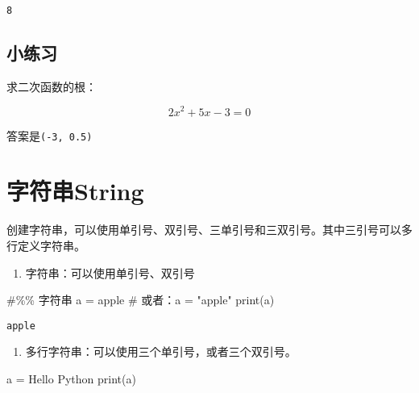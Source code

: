 \documentclass[
  letterpaper,
  DIV=11,
  numbers=noendperiod]{scrreprt}
\newenvironment{Shaded}{\begin{snugshade}}{\end{snugshade}}
\newcommand{\BuiltInTok}[1]{\textcolor[rgb]{0.00,0.23,0.31}{#1}}
\newcommand{\CommentTok}[1]{\textcolor[rgb]{0.37,0.37,0.37}{#1}}
\newcommand{\NormalTok}[1]{\textcolor[rgb]{0.00,0.23,0.31}{#1}}
\newcommand{\OperatorTok}[1]{\textcolor[rgb]{0.37,0.37,0.37}{#1}}
\newcommand{\StringTok}[1]{\textcolor[rgb]{0.13,0.47,0.30}{#1}}
\providecommand{\tightlist}{%
  \setlength{\itemsep}{0pt}\setlength{\parskip}{0pt}}\usepackage{longtable,booktabs,array}
\begin{document}
\begin{verbatim}
8
\end{verbatim}

\hypertarget{ux5c0fux7ec3ux4e60}{%
\subsection{小练习}\label{ux5c0fux7ec3ux4e60}}

求二次函数的根：

\[
2x^2 + 5x - 3 = 0
\]

答案是\texttt{(-3,\ 0.5)}

\hypertarget{ux5b57ux7b26ux4e32string}{%
\section{字符串String}\label{ux5b57ux7b26ux4e32string}}

创建字符串，可以使用单引号、双引号、三单引号和三双引号。其中三引号可以多行定义字符串。

\begin{enumerate}
\def\labelenumi{\arabic{enumi}.}
\tightlist
\item
  字符串：可以使用单引号、双引号
\end{enumerate}

\begin{Shaded}
\begin{Highlighting}[]
\CommentTok{\#\%\% 字符串}
\NormalTok{a }\OperatorTok{=} \StringTok{\textquotesingle{}apple\textquotesingle{}} \CommentTok{\# 或者：a = "apple"}
\BuiltInTok{print}\NormalTok{(a)}
\end{Highlighting}
\end{Shaded}

\begin{verbatim}
apple
\end{verbatim}

\begin{enumerate}
\def\labelenumi{\arabic{enumi}.}
\setcounter{enumi}{1}
\tightlist
\item
  多行字符串：可以使用三个单引号，或者三个双引号。
\end{enumerate}

\begin{Shaded}
\begin{Highlighting}[]
\NormalTok{a }\OperatorTok{=} \StringTok{\textquotesingle{}\textquotesingle{}\textquotesingle{}Hello }
\StringTok{Python}
\StringTok{\textquotesingle{}\textquotesingle{}\textquotesingle{}}
\BuiltInTok{print}\NormalTok{(a)}
\end{Highlighting}
\end{Shaded}
\end{document}
